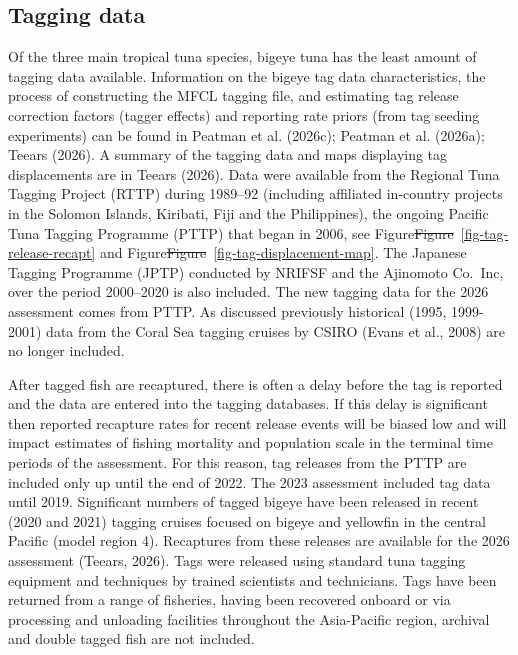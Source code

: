 \documentclass[
  english,
  a4paper,
  a4paper,
  11pt]{SCreport}
\providecommand{\DIFdel}[1]{{\protect\color{red}\sout{#1}}}                      %
\providecommand{\DIFdelbegin}{} %
\providecommand{\DIFdelend}{} %
\newcommand{\DIFscaledelfig}{0.5}
\newlength{\DIFdelgraphicswidth} %
\newlength{\DIFdelgraphicsheight} %
\newcommand{\DIFdelincludegraphics}[2][]{%
\sbox{\DIFdelgraphicsbox}{\DIFOincludegraphics[#1]{#2}}%
\settoboxwidth{\DIFdelgraphicswidth}{\DIFdelgraphicsbox} %
\settoboxtotalheight{\DIFdelgraphicsheight}{\DIFdelgraphicsbox} %
\scalebox{\DIFscaledelfig}{%
\parbox[b]{\DIFdelgraphicswidth}{\usebox{\DIFdelgraphicsbox}\\[-\baselineskip] \rule{\DIFdelgraphicswidth}{0em}}\llap{\resizebox{\DIFdelgraphicswidth}{\DIFdelgraphicsheight}{%
\setlength{\unitlength}{\DIFdelgraphicswidth}%
\begin{picture}(1,1)%
\thicklines\linethickness{2pt} %
{\color[rgb]{1,0,0}\put(0,0){\framebox(1,1){}}}%
{\color[rgb]{1,0,0}\put(0,0){\line( 1,1){1}}}%
{\color[rgb]{1,0,0}\put(0,1){\line(1,-1){1}}}%
\end{picture}%
}\hspace*{3pt}}} %
} %
\DeclareRobustCommand{\DIFdelbegin}{\DIFOdelbegin \let\includegraphics\DIFdelincludegraphics} %
\DeclareRobustCommand{\DIFdelend}{\DIFOaddend \let\includegraphics\DIFOincludegraphics} %
\begin{document}
\subsection{Tagging data}\label{sec-tag-data}

Of the three main tropical tuna species, bigeye tuna has the least
amount of tagging data available. Information on the bigeye tag data
characteristics, the process of constructing the MFCL tagging file, and
estimating tag release correction factors (tagger effects) and reporting
rate priors (from tag seeding experiments) can be found in Peatman et
al. (2026c); Peatman et al. (2026a); Teears (2026). A summary of the
tagging data and maps displaying tag displacements are in Teears (2026).
Data were available from the Regional Tuna Tagging Project (RTTP) during
1989--92 (including affiliated in-country projects in the Solomon
Islands, Kiribati, Fiji and the Philippines), the ongoing Pacific Tuna
Tagging Programme (PTTP) that began in 2006, see
Figure\DIFdelbegin \DIFdel{Figure}\DIFdelend ~\ref{fig-tag-release-recapt} and
Figure\DIFdelbegin \DIFdel{Figure}\DIFdelend ~\ref{fig-tag-displacement-map}. The Japanese Tagging Programme
(JPTP) conducted by NRIFSF and the Ajinomoto Co.~Inc, over the period
2000--2020 is also included. The new tagging data for the 2026
assessment comes from PTTP. As discussed previously historical (1995,
1999-2001) data from the Coral Sea tagging cruises by CSIRO (Evans et
al., 2008) are no longer included.

After tagged fish are recaptured, there is often a delay before the tag
is reported and the data are entered into the tagging databases. If this
delay is significant then reported recapture rates for recent release
events will be biased low and will impact estimates of fishing mortality
and population scale in the terminal time periods of the assessment. For
this reason, tag releases from the PTTP are included only up until the
end of 2022. The 2023 assessment included tag data until 2019.
Significant numbers of tagged bigeye have been released in recent (2020
and 2021) tagging cruises focused on bigeye and yellowfin in the central
Pacific (model region 4). Recaptures from these releases are available
for the 2026 assessment (Teears, 2026). Tags were released using
standard tuna tagging equipment and techniques by trained scientists and
technicians. Tags have been returned from a range of fisheries, having
been recovered onboard or via processing and unloading facilities
throughout the Asia-Pacific region, archival and double tagged fish are
not included.
\end{document}
